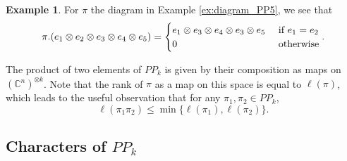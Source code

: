 \documentclass{amsart}
\theoremstyle{definition}
\newtheorem{example}[lemma]{Example}
\newcommand{\C}{\mathbb{C}}
\newcommand{\PP}{P\!P}
\begin{document}
\begin{example}
	For $\pi$ the diagram in Example \ref{ex:diagram_PP5},
       we see that
       \[\pi.(e_1\otimes e_2\otimes e_3\otimes e_4\otimes e_5)=
       \begin{cases} e_1\otimes e_3\otimes e_4\otimes e_3\otimes e_5&\hbox{ if } e_1=e_2\\
       0&\hbox{ otherwise}\end{cases}.\]
\end{example}

The product of two elements of $\PP_k$ is given by their composition as maps on $(\C^n)^{\otimes k}$.
Note that the rank of $\pi$ as a map on this space is equal to $\ell(\pi)$, which leads to the useful
observation that for any $\pi_1,\pi_2\in \PP_k$, \begin{equation}\label{eq:rank_monotone}
	\ell(\pi_1\pi_2)\leq\min\{\ell(\pi_1),\ell(\pi_2)\}.
\end{equation}

\subsection{Characters of $\PP_k$}
\label{subsec:characers_PP}
\end{document}
